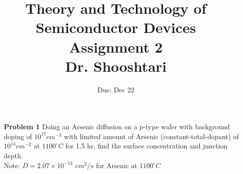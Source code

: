 \documentclass{report}
\title{Theory and Technology of Semiconductor Devices\\ Assignment 2 \\ \vspace{30pt} Dr. Shooshtari}
\author{}
\date{Due: Dec 22}
\begin{document}
	\maketitle
	
	\begin{enumerate}
		\item[\bf{Problem 1}] Doing an Arsenic diffusion on a p-type wafer with background doping of $10^{17} cm^{-3}$ with limited amount of Arsenic (constant-total-dopant) of $10^{14} cm^{-2}$ at $1100^{\circ} C$ for 1.5 hr, find the surface concentration and junction depth. \\
		Note: $D=2.07\times 10^{-14}$ $cm^2/s$ for Arsenic at $1100^{\circ} C$ 
	\end{enumerate}
\end{document}
